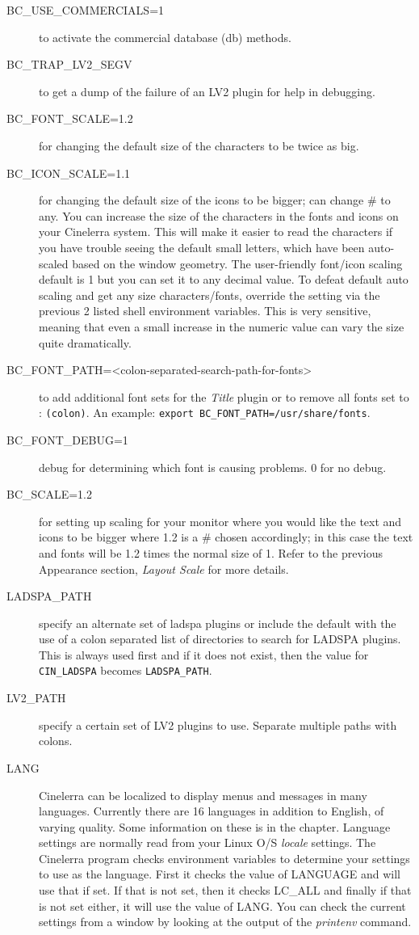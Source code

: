 \begin{description}
    \item[{\small BC\_USE\_COMMERCIALS=1}] to activate the commercial database (db) methods.
    \item[{\small BC\_TRAP\_LV2\_SEGV}] to get a dump of the failure of an LV2 plugin for help in debugging.
    \item[{\small BC\_FONT\_SCALE=1.2}] for changing the default size of the characters to be twice as big.
    \item[{\small BC\_ICON\_SCALE=1.1}] for changing the default size of the icons to be bigger; can change \# to any. You can increase the size of the characters in the fonts and icons on your Cinelerra system.  This will make it easier to read the characters if you have trouble seeing the default small letters, which have been auto-scaled based on the window geometry. The user-friendly font/icon scaling default is 1 but you can set it to any decimal value.  To defeat default auto scaling and get any size characters/fonts, override the setting via the previous 2 listed shell environment variables. This is very sensitive, meaning that even a small increase in the numeric value can vary the size quite dramatically.
    \item[{\small BC\_FONT\_PATH=<colon-separated-search-path-for-fonts>}]  to add additional font sets for the \textit{Title}
    plugin or to remove all fonts set to : \texttt{(colon)}.  An example: \texttt{export BC\_FONT\_PATH=/usr/share/fonts}.
    \item[{\small BC\_FONT\_DEBUG=1}] debug for determining which font is causing problems.  0 for no debug.
    \item[{\small BC\_SCALE=1.2}] for setting up scaling for your monitor where you would like the text and icons to be bigger where 1.2 is a \# chosen accordingly; in this case the text and fonts will be 1.2 times the
normal size of 1. Refer to the previous Appearance section, \textit{Layout Scale} for more details.
    \item[{\small LADSPA\_PATH}] specify an alternate set of ladspa plugins or include the default with the use of a colon separated list of directories to search for LADSPA plugins. This is always used first and if it does not
    exist, then the value for \texttt{CIN\_LADSPA} becomes \texttt{LADSPA\_PATH}.
    \item[{\small LV2\_PATH}] specify a certain set of LV2 plugins to use.  Separate multiple paths with colons.
    \item[{\small LANG}] Cinelerra can be localized to display menus and messages in many languages.
Currently there are 16 languages in addition to English, of varying quality. Some information on
these is in the  chapter.
Language settings are normally read from your Linux O/S \textit{locale} settings. 
The Cinelerra program checks environment variables to determine your settings to use as the language.
First it checks the value of LANGUAGE and will use that if set.
If that is not set, then it checks 
LC\_ALL and finally if that is not set either, it will use the value of LANG. You can check the current
settings from a window by looking at the output of the \textit{printenv} command.


\end{description}
